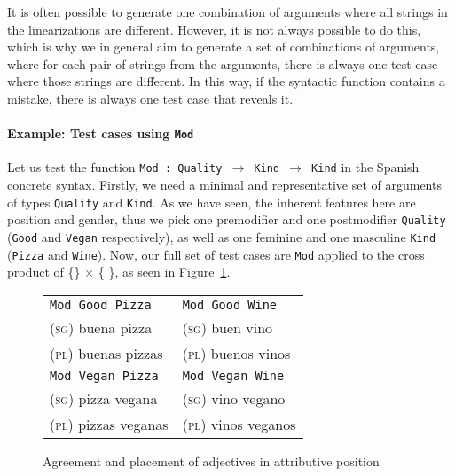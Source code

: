 \documentclass[runningheads]{llncs}
\def\t#1{\texttt{#1}}
\begin{document}
It is often possible to generate one combination of arguments where
all strings in the linearizations are different. However, it is not
always possible to do this, which is why we in general aim to generate
a set of combinations of arguments, where for each pair of strings
from the arguments, there is always one test case where those strings
are different. In this way, if the syntactic function contains a
mistake, there is always one test case that reveals it.

\paragraph{Example: Test cases using \t{Mod}} Let us test the function
\t{Mod : Quality $\rightarrow$ Kind $\rightarrow$ Kind} in the Spanish
concrete syntax.
Firstly, we need a minimal and representative set of arguments of types
\t{Quality} and \t{Kind}. As we have seen, the inherent features here
are position and gender, thus we pick one premodifier and one
postmodifier \t{Quality} (\t{Good} and \t{Vegan} respectively), as
well as one feminine and one masculine \t{Kind} (\t{Pizza} and \t{Wine}).
Now, our full set of test cases are \t{Mod} applied to the cross
product of \{\}
$\times$ \{ \}, as
seen in Figure~\ref{fig:adjAttr}.

\begin{figure}
\centering
\centering
\begin{tabular}{| l | l |}
\hline
\t{Mod Good Pizza}   & \t{Mod Good Wine} \\ 
\textsc{(sg)} buena pizza             & \textsc{(sg)} buen vino \\
\textsc{(pl)} buenas pizzas           & \textsc{(pl)} buenos vinos \\ \hline

\t{Mod Vegan Pizza}   & \t{Mod Vegan Wine} \\ 
\textsc{(sg)} pizza  vegana            & \textsc{(sg)} vino  vegano \\
\textsc{(pl)} pizzas  veganas          & \textsc{(pl)} vinos  veganos \\ \hline
\end{tabular}
\caption{Agreement and placement of adjectives in attributive position}
\label{fig:adjAttr}
\end{figure}
\end{document}
